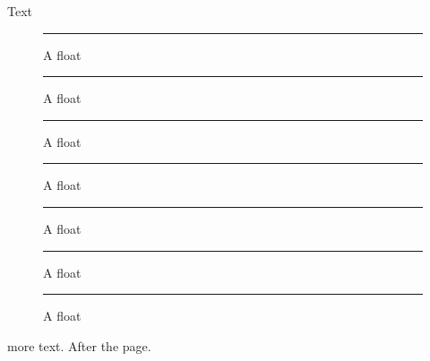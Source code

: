 \documentclass{article}
\newcommand\fig[1]{\begin{figure}[#1]\centering\rule{1cm}{100pt}\caption{A float}\end{figure}}
\begin{document}
Text \fig{p}\fig{p}\fig{p}\fig{htbp}\fig{p}\fig{h!}\fig{p} more text.
\clearpage
After the page.
\gdef\SatexReachedEnd{}
\end{document}
